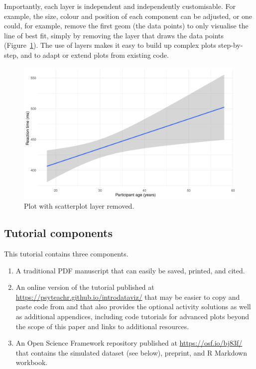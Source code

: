 \documentclass[
  english,
  doc,floatsintext]{apa6}
\providecommand{\tightlist}{%
  \setlength{\itemsep}{0pt}\setlength{\parskip}{0pt}}
\begin{document}
Importantly, each layer is independent and independently customisable. For example, the size, colour and position of each component can be adjusted, or one could, for example, remove the first geom (the data points) to only visualise the line of best fit, simply by removing the layer that draws the data points (Figure~\ref{fig:remove-layer}). The use of layers makes it easy to build up complex plots step-by-step, and to adapt or extend plots from existing code.

\begin{figure}

{\centering \includegraphics[width=1\linewidth]{images/remove-layer-1} 

}

\caption{Plot with scatterplot layer removed.}\label{fig:remove-layer}
\end{figure}

\hypertarget{tutorial-components}{%
\subsection{Tutorial components}\label{tutorial-components}}

This tutorial contains three components.

\begin{enumerate}
\def\labelenumi{\arabic{enumi}.}
\tightlist
\item
  A traditional PDF manuscript that can easily be saved, printed, and cited.
\item
  An online version of the tutorial published at \url{https://psyteachr.github.io/introdataviz/} that may be easier to copy and paste code from and that also provides the optional activity solutions as well as additional appendices, including code tutorials for advanced plots beyond the scope of this paper and links to additional resources.
\item
  An Open Science Framework repository published at \url{https://osf.io/bj83f/} that contains the simulated dataset (see below), preprint, and R Markdown workbook.
\end{enumerate}
\end{document}
